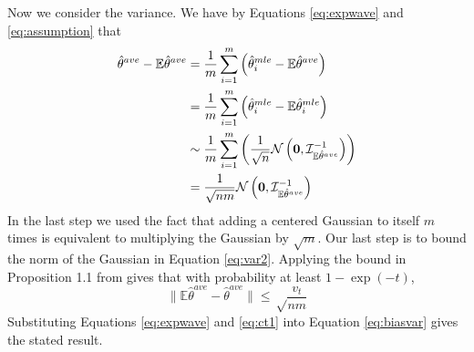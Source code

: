 \documentclass[twoside]{article}
\DeclareMathOperator*{\tr}{tr}
\newcommand{\zero}{\text{\textbf{0}}}
\newcommand{\E}{\mathbb{E}}
\newcommand{\w}{\theta}
\newcommand{\wave}{\hat\w^{ave}}
\newcommand{\wtave}{\E\hat\w^{ave}}
\newcommand{\wmle}{\hat\w^{mle}}
\newcommand{\I}{\mathcal I}
\newcommand{\normal}[2]{\ensuremath{\mathcal{N}\left({{#1}},{{#2}}\right)}}
\newcommand{\ltwo}[1]{{\lVert {#1} \rVert}}
\begin{document}
Now we consider the variance.
We have by Equations \ref{eq:expwave} and \ref{eq:assumption} that
\begin{align}
\wave-\E\wave
&=
\frac{1}{m}\sum_{i=1}^m\left(\wmle_i-\E\wave\right)
\label{eq:var1}
\\&=
\frac{1}{m}\sum_{i=1}^m\left(\wmle_i-\E\wmle_i\right)
\\&\sim
\frac{1}{m}\sum_{i=1}^m\left(\frac{1}{\sqrt n}\normal\zero{\I^{-1}_{\E\wave}}\right)
\\&=
\frac{1}{\sqrt {nm}}\normal\zero{\I^{-1}_{\E\wave}}
\label{eq:var2}
\end{align}
In the last step we used the fact that adding a centered Gaussian to itself $m$ times is equivalent to multiplying the Gaussian by $\sqrt{m}$.
Our last step is to bound the norm of the Gaussian in Equation \ref{eq:var2}.
Applying the bound in Proposition 1.1 from \cite{hsu2012tail} gives that with probability at least $1-\exp(-t)$,
\begin{equation}
\ltwo{\E\wave-\wave} \le \sqrt\frac{v_t}{nm}
\label{eq:ct1}
\end{equation}
Substituting Equations \ref{eq:expwave} and \ref{eq:ct1} into Equation \ref{eq:biasvar} gives the stated result.
\end{document}
